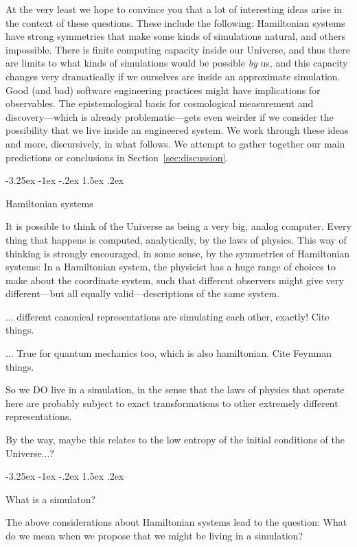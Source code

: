 \documentclass[12pt,letterpaper]{article}
\makeatletter
\renewcommand\section{\@startsection {section}{1}{\z@}%
  {-3.25ex \@plus -1ex \@minus -.2ex}%
  {1.5ex \@plus .2ex}%
  {\raggedright\normalfont\large\bfseries}}
\newcommand{\sectionname}{Section}
\newcommand{\secref}[1]{\sectionname~\ref{#1}}
\makeatother
\begin{document}
At the very least we hope to convince you that a lot of interesting ideas arise in the context of these questions.
These include the following:
Hamiltonian systems have strong symmetries that make some kinds of simulations natural, and others impossible.
There is finite computing capacity inside our Universe, and thus there are limits to what kinds of simulations would be possible \emph{by} us, and this capacity changes very dramatically if we ourselves are inside an approximate simulation.
Good (and bad) software engineering practices might have implications for observables.
The epistemological basis for cosmological measurement and discovery---which is already problematic---gets even weirder if we consider the possibility that we live inside an engineered system.
We work through these ideas and more, discursively, in what follows.
We attempt to gather together our main predictions or conclusions in \secref{sec:discussion}.

\section{Hamiltonian systems}

It is possible to think of the Universe as being a very big, analog computer.
Every thing that happens is computed, analytically, by the laws of physics.
This way of thinking is strongly encouraged, in some sense, by the symmetries of Hamiltonian systems:
In a Hamiltonian system, the physicist has a huge range of choices to make about the coordinate system, such that different observers might give very different---but all equally valid---descriptions of the same system.

... different canonical representations are simulating each other, exactly! Cite things.

... True for quantum mechanics too, which is also hamiltonian. Cite Feynman things.

So we DO live in a simulation, in the sense that the laws of physics that operate here are probably subject to exact transformations to other extremely different representations.

By the way, maybe this relates to the low entropy of the initial conditions of the Universe...?

\section{What is a simulaton?}

The above considerations about Hamiltonian systems lead to the question: What do we mean when we propose that we might be living in a simulation?
\end{document}
